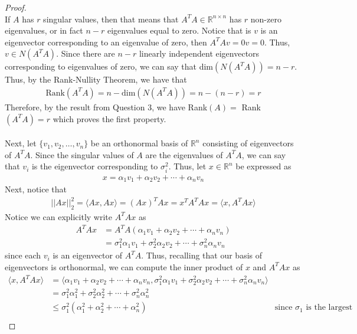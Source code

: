 \documentclass[10pt,a4paper]{article}
\theoremstyle{definition}
\theoremstyle{definition}
\numberwithin{equation}{section}
\begin{document}
\begin{proof}$ $
\\If $A$ has $r$ singular values, then that means that $A^TA \in \mathbb{R}^{n \times n}$ has $r$ non-zero eigenvalues, or in fact $n - r$ eigenvalues equal to zero. Notice that is $v$ is an eigenvector corresponding to an eigenvalue of zero, then $A^TAv = 0v = 0$. Thus, $v \in N(A^TA)$. Since there are $n - r$ linearly independent eigenvectors corresponding to eigenvalues of zero, we can say that dim$(N(A^TA)) = n - r$. Thus, by the Rank-Nullity Theorem, we have that
\begin{align*}
\text{Rank}(A^TA) = n - \text{dim}(N(A^TA)) = n - (n - r) = r
\end{align*}
Therefore, by the result from Question 3, we have Rank$(A) = $ Rank$(A^TA) = r$ which proves the first property. 
\\
\\Next, let $\{v_1, v_2, \ldots, v_n\}$ be an orthonormal basis of $\mathbb{R}^n$ consisting of eigenvectors of $A^TA$. Since the singular values of 
$A$ are the eigenvalues of $A^TA$, we can say that $v_i$ is the eigenvector corresponding to $\sigma_i^2$. Thus, let $x \in \mathbb{R}^n$ be expressed as
\begin{align*}
x = \alpha_1 v_1 + \alpha_2 v_2 + \cdots + \alpha_n v_n
\end{align*}
Next, notice that 
\begin{align*}
||Ax||_2^2 = \langle Ax, Ax \rangle = (Ax)^T Ax = x^T A^T A x = \langle x, A^T A x \rangle
\end{align*}
Notice we can explicitly write $A^TAx$ as
\begin{align*}
A^TAx &= A^TA(\alpha_1 v_1 + \alpha_2 v_2 + \cdots + \alpha_n v_n)\\
&= \sigma_1^2\alpha_1 v_1 + \sigma_2^2\alpha_2 v_2 + \cdots + \sigma_n^2\alpha_n v_n
\end{align*}
since each $v_i$ is an eigenvector of $A^TA$. Thus, recalling that our basis of eigenvectors is orthonormal, we can compute the inner product of $x$ and $A^TAx$ as
\begin{align*}
\langle x, A^T A x \rangle &= \langle \alpha_1 v_1 + \alpha_2 v_2 + \cdots + \alpha_n v_n, \sigma_1^2\alpha_1 v_1 + \sigma_2^2\alpha_2 v_2 + \cdots + \sigma_n^2\alpha_n v_n \rangle\\
&= \sigma_1^2\alpha_1^2 + \sigma_2^2\alpha_2^2 + \cdots + \sigma_n^2\alpha_n^2\\
&\leq \sigma_1^2 (\alpha_1^2 + \alpha_2^2 + \cdots + \alpha_n^2) &\text{since $\sigma_1$ is the largest singular value}\\

\end{align*}
\end{proof}
\end{document}
